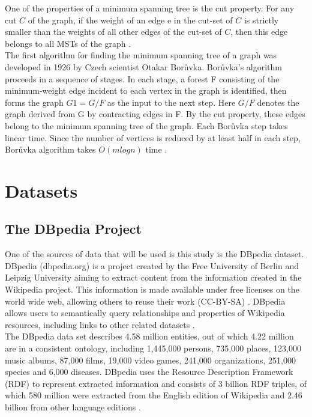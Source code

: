 \documentclass[10pt,11pt,12pt,oneside]{book}
\begin{document}
	One of the properties of a minimum spanning tree is the cut property. For any cut $C$ of the graph, if the weight of an edge e in the cut-set of $C$ is strictly smaller than the weights of all other edges of the cut-set of $C$, then this edge belongs to all MSTs of the graph \cite{bang2008digraphs}.\\
	The first algorithm for finding the minimum spanning tree of a graph was developed in 1926 by Czech scientist Otakar Borůvka. Borůvka’s algorithm proceeds in a sequence of stages. In each stage, a forest F consisting of the minimum-weight edge incident to each vertex in the graph is identified, then forms the graph $G1 = G/F$ as the input to the next step. Here $G/F$ denotes the graph derived from G by contracting edges in F. By the cut property, these edges belong to the minimum spanning tree of the graph. Each Borůvka step takes linear time. Since the number of vertices is reduced by at least half in each step, Borůvka algorithm takes $O(m log n)$ time \cite{bang2008digraphs}.\\
	
	
	
	
	
	
	
	
	
	
	
	
	
	
	
	
	
	
	
	\section{Datasets}
	 
	\subsection{The DBpedia Project}
	One of the sources of data that will be used is this study is the DBpedia dataset. DBpedia (dbpedia.org) is a project created by the Free University of Berlin and Leipzig University aiming to extract content from the information created in the Wikipedia project. This information is made available under free licenses on the world wide web, allowing others to reuse their work (CC-BY-SA) \cite{ciampaglia2015computational}. DBpedia allows users to semantically query relationships and properties of Wikipedia resources, including links to other related datasets \cite{dbpedia}.\\[8pt]
	The DBpedia data set describes 4.58 million entities, out of which 4.22 million are in a consistent ontology, including 1,445,000 persons, 735,000 places, 123,000 music albums, 87,000 films, 19,000 video games, 241,000 organizations, 251,000 species and 6,000 diseases. DBpedia uses the Resource Description Framework (RDF) to represent extracted information and consists of 3 billion RDF triples, of which 580 million were extracted from the English edition of Wikipedia and 2.46 billion from other language editions \cite{dbpedia}.
	
\end{document}
